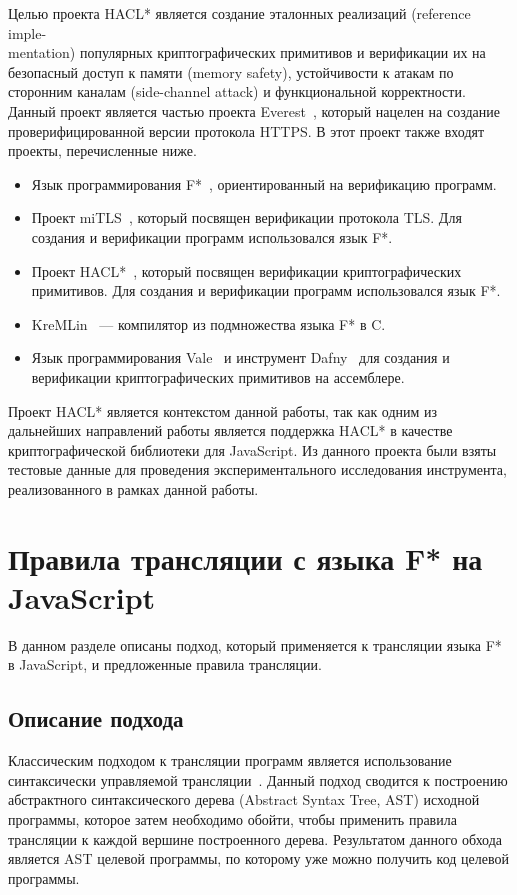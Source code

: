 \documentclass[12pt]{matmex-diploma}
\begin{document}
Целью проекта HACL* является создание эталонных реализаций (reference imple-\\mentation) популярных криптографических примитивов и верификации их на безопасный доступ к памяти (memory safety), устойчивости к атакам по сторонним каналам (side-channel attack) и функциональной корректности. Данный проект является частью проекта Everest~\cite{everest}, который нацелен на создание проверифицированной версии протокола HTTPS. В этот проект также входят проекты, перечисленные ниже.

\begin{itemize}
    \item Язык программирования F*~\cite{fstar}, ориентированный на верификацию программ.
    \item Проект miTLS~\cite{mitls}, который посвящен верификации протокола TLS. Для создания и верификации программ использовался язык F*.
    \item Проект HACL*~\cite{hacl_star}, который посвящен верификации криптографических примитивов. Для создания и верификации программ использовался язык F*.  
    \item KreMLin~\cite{kremlin} --- компилятор из подмножества языка F* в C.
    \item Язык программирования Vale~\cite{vale} и инструмент Dafny~\cite{dafny} для создания и верификации криптографических примитивов на ассемблере.
\end{itemize}

Проект HACL* является контекстом данной работы, так как одним из дальнейших направлений работы является поддержка HACL* в качестве криптографической библиотеки для JavaScript. Из данного проекта были взяты тестовые данные для проведения экспериментального исследования инструмента, реализованного в рамках данной работы.


\section{Правила трансляции с языка F* на JavaScript}

В данном разделе описаны подход, который применяется к трансляции языка F* в JavaScript, и предложенные правила трансляции.

\subsection{Описание подхода}

Классическим подходом к трансляции программ является использование синтаксически управляемой трансляции~\cite{dragons}. Данный подход сводится к построению абстрактного синтаксического дерева (Abstract Syntax Tree, AST) исходной программы, которое затем необходимо обойти, чтобы применить правила трансляции к каждой вершине построенного дерева. Результатом данного обхода является AST целевой программы, по которому уже можно получить код целевой программы. 
\end{document}
